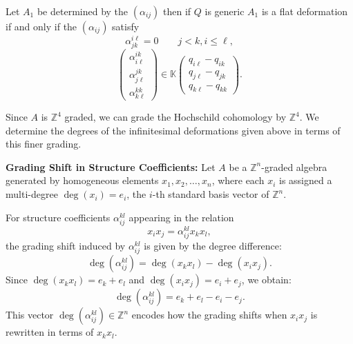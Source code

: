 \documentclass{amsart}
\begin{document}
\begin{proposition}
Let $A_1$ be determined by the $(\alpha_{ij})$ then if $Q$ is generic $A_1$ is a flat deformation if and only if the $(\alpha_{ij})$ satisfy
  $$ \alpha_{jk}^{i\ell} = 0 \quad \quad j < k, i \leq \ell,$$
$$\begin{pmatrix}
  \alpha^{ik}_{i\ell} \\ \alpha^{jk}_{j\ell} \\  \alpha^{kk}_{k\ell}
\end{pmatrix}
\in \mathbb{K}
\begin{pmatrix}
  q_{i\ell} - q_{ik} \\ q_{j\ell} - q_{jk} \\ q_{k\ell} - q_{kk}
\end{pmatrix}.$$
\end{proposition}
Since $A$ is $\mathbb{Z}^4$ graded, we can grade the Hochschild cohomology by $\mathbb{Z}^4$.  We determine the degrees of the infinitesimal deformations given above in terms of this finer grading.
\begin{definition}
\textnormal{\textbf{Grading Shift in Structure Coefficients:} Let \( A \) be a \( \mathbb{Z}^n \)-graded algebra generated by homogeneous elements \( x_1, x_2, \dots, x_n \), where each \( x_i \) is assigned a multi-degree \( \deg(x_i) = e_i \), the \( i \)-th standard basis vector of \( \mathbb{Z}^n \).}

\textnormal{For structure coefficients \( \alpha_{ij}^{kl} \) appearing in the relation
\[
x_i x_j = \alpha_{ij}^{kl} x_k x_l,
\]
the grading shift induced by \( \alpha_{ij}^{kl} \) is given by the degree difference:}
\[
\deg(\alpha_{ij}^{kl}) = \deg(x_k x_l) - \deg(x_i x_j).
\]
\textnormal{Since \( \deg(x_k x_l) = e_k + e_l \) and \( \deg(x_i x_j) = e_i + e_j \), we obtain:
\[
\deg(\alpha_{ij}^{kl}) = e_k + e_l - e_i - e_j.
\]
This vector \( \deg(\alpha_{ij}^{kl}) \in \mathbb{Z}^n \) encodes how the grading shifts when \( x_i x_j \) is rewritten in terms of \( x_k x_l \).}
\end{definition}
\end{document}
